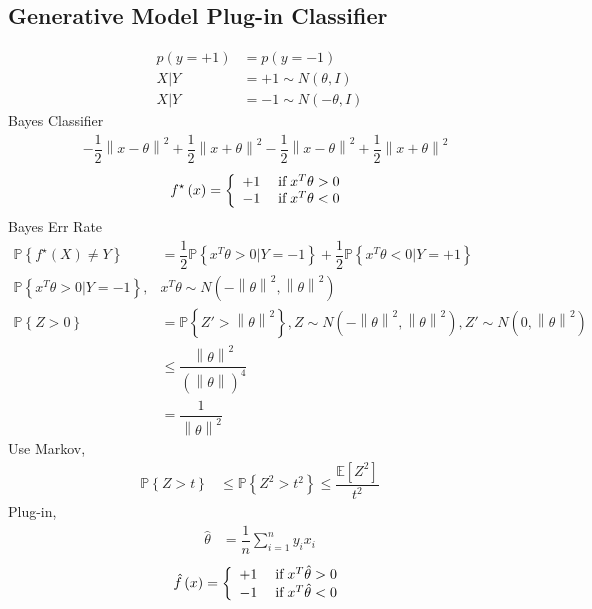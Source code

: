 \documentclass{article}
\begin{document}
\subsection{Generative Model Plug-in Classifier}
\begin{align*}
p\left(y = +1\right)  &= p\left(y = -1\right)
\\ X  | Y &= +1 \sim  N\left(\theta, I\right)
\\ X  | Y &= -1 \sim  N\left(-\theta, I\right)
\end{align*}
Bayes Classifier
\begin{align*}
&- \dfrac{1}{2} \left\|x - \theta\right\|^{2} + \dfrac{1}{2} \left\|x + \theta\right\|^{2} - \dfrac{1}{2} \left\|x - \theta\right\|^{2} + \dfrac{1}{2} \left\|x + \theta\right\|^{2}
\end{align*}
\[ f^\star \left(x\right) =\left\{ \begin{array}{ll}
+1& \text{\;if\;} x^{T} \theta > 0 \\
-1& \text{\;if\;} x^{T} \theta < 0 \\
\end{array}\right. \]
Bayes Err Rate
\begin{align*}
\mathbb{P}\left\{f^\star \left(X\right) \neq  Y\right\} &= \dfrac{1}{2} \mathbb{P}\left\{x^{T} \theta > 0 | Y = -1\right\} + \dfrac{1}{2} \mathbb{P}\left\{x^{T} \theta < 0 | Y = +1\right\}
\\ \mathbb{P}\left\{x^{T} \theta > 0 | Y = -1\right\}, &  x^{T} \theta \sim  N\left(-\left\|\theta\right\|^{2}, \left\|\theta\right\|^{2}\right)
\\ \mathbb{P}\left\{Z > 0\right\} &= \mathbb{P}\left\{Z' > \left\|\theta\right\|^{2}\right\}, Z \sim  N\left(-\left\|\theta\right\|^{2}, \left\|\theta\right\|^{2}\right), Z' \sim  N\left(0, \left\|\theta\right\|^{2}\right)
\\ &\leq  \dfrac{\left\|\theta\right\|^{2}}{\left(\left\|\theta\right\|\right)^{4}}
\\ &= \dfrac{1}{\left\|\theta\right\|^{2}}
\end{align*}
Use Markov,
\begin{align*}
\mathbb{P}\left\{Z > t\right\} &\leq  \mathbb{P}\left\{Z^{2} > t^{2}\right\} \leq  \dfrac{\mathbb{E}\left[Z^{2}\right]}{t^{2}}
\end{align*}
Plug-in,
\begin{align*}
\hat{\theta} &= \dfrac{1}{n} \displaystyle\sum_{i=1}^{n} y_{i} x_{i}
\end{align*}
\[ \hat{f}\left(x\right) =\left\{ \begin{array}{ll}
+1& \text{\;if\;} x^{T} \hat{\theta} > 0 \\
-1& \text{\;if\;} x^{T} \hat{\theta} < 0 \\
\end{array}\right. \]
\end{document}
